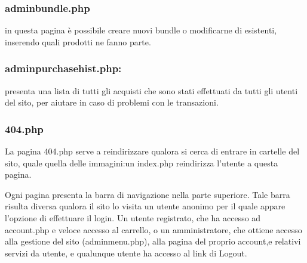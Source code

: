\subsubsection{adminbundle.php}\Spazio in questa pagina è possibile creare nuovi bundle o modificarne di esistenti, inserendo quali prodotti ne fanno parte.

\subsubsection{adminpurchasehist.php:} \Spazio presenta una lista di tutti gli acquisti che sono stati effettuati da tutti gli utenti del sito, per aiutare in caso di problemi con le transazioni.

\subsubsection{404.php} \Spazio
La pagina 404.php serve a reindirizzare qualora si cerca di entrare in cartelle del sito, quale quella delle immagini:un index.php reindirizza l'utente a questa pagina.


Ogni pagina presenta la barra di navigazione nella parte superiore. Tale barra risulta diversa qualora il sito lo visita un utente anonimo per il quale appare l'opzione di effettuare il login. Un utente registrato, che ha accesso ad account.php e veloce accesso al carrello, o un amministratore, che ottiene accesso alla gestione del sito (adminmenu.php), alla pagina del proprio account,e relativi servizi da utente, e qualunque utente ha accesso al link di Logout.

